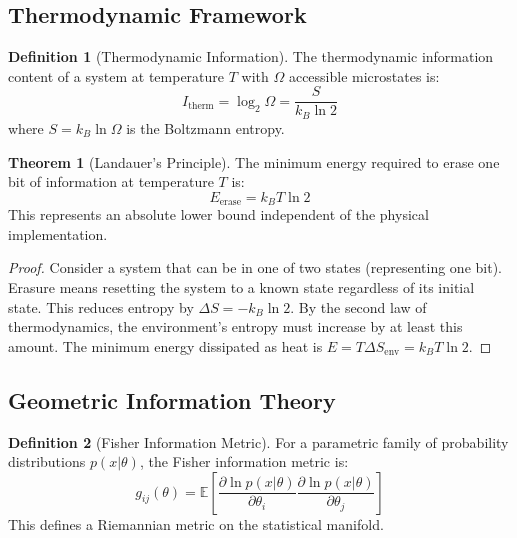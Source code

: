 \documentclass[11pt,a4paper]{article}
\theoremstyle{definition}
\newtheorem{definition}{Definition}[section]
\newtheorem{theorem}{Theorem}[section]
\begin{document}
\subsection{Thermodynamic Framework}

\begin{definition}[Thermodynamic Information]
The thermodynamic information content of a system at temperature $T$ with $\Omega$ accessible microstates is:
\begin{equation}
I_{\text{therm}} = \log_2 \Omega = \frac{S}{k_B \ln 2}
\end{equation}
where $S = k_B \ln \Omega$ is the Boltzmann entropy.
\end{definition}

\begin{theorem}[Landauer's Principle]
The minimum energy required to erase one bit of information at temperature $T$ is:
\begin{equation}
E_{\text{erase}} = k_B T \ln 2
\end{equation}
This represents an absolute lower bound independent of the physical implementation.
\end{theorem}

\begin{proof}
Consider a system that can be in one of two states (representing one bit). Erasure means resetting the system to a known state regardless of its initial state. This reduces entropy by $\Delta S = -k_B \ln 2$. By the second law of thermodynamics, the environment's entropy must increase by at least this amount. The minimum energy dissipated as heat is $E = T \Delta S_{\text{env}} = k_B T \ln 2$.
\end{proof}

\subsection{Geometric Information Theory}

\begin{definition}[Fisher Information Metric]
For a parametric family of probability distributions $p(x|\theta)$, the Fisher information metric is:
\begin{equation}
g_{ij}(\theta) = \mathbb{E}\left[\frac{\partial \ln p(x|\theta)}{\partial \theta_i} \frac{\partial \ln p(x|\theta)}{\partial \theta_j}\right]
\end{equation}
This defines a Riemannian metric on the statistical manifold.
\end{definition}
\end{document}
